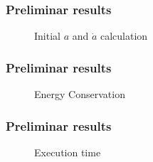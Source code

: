 \begin{frame}
    \frametitle{Preliminar results}
    \begin{figure}
        \centering
        \label{fig:init-time}
        \caption{Initial $a$ and $\dot{a}$ calculation}
    \end{figure}
\end{frame}

\begin{frame}
    \frametitle{Preliminar results}
    \begin{figure}
        \centering
        \label{fig:init-time}
        \caption{Energy Conservation}
    \end{figure}
\end{frame}

\begin{frame}
    \frametitle{Preliminar results}
    \begin{figure}
        \centering
        \label{fig:init-time}
        \caption{Execution time}
    \end{figure}
\end{frame}
